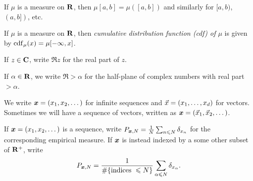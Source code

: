 If $\mu$ is a measure on $\mathbf{R}$, then $\mu[a,b] = \mu([a,b])$ and similarly 
for $[a,b)$, $(a,b])$, etc. 

If $\mu$ is a measure on $\mathbf{R}$, then \emph{cumulative distribution function 
(cdf) of $\mu$} is given by $\operatorname{cdf}_\mu(x) = \mu[-\infty,x]$. 

If $z\in \mathbf{C}$, write $\Re z$ for the real part of $z$. 

If $\alpha\in \mathbf{R}$, we write $\Re > \alpha$ for the half-plane of complex 
numbers with real part $> \alpha$. 

We write ${\boldsymbol x} = (x_1,x_2,\dots)$ for infinite sequences and 
$\vec{x} = (x_1,\dots,x_d)$ for vectors. Sometimes we will have a sequence of 
vectors, written as ${\boldsymbol x} = (\vec{x}_1,\vec{x}_2,\dots)$. 

If ${\boldsymbol x}=(x_1,x_2,\dots)$ is a sequence, write 
$P_{{\boldsymbol x},N} = \frac{1}{N} \sum_{n\leqslant N} \delta_{x_n}$ for the 
corresponding empirical measure. If ${\boldsymbol x}$ is instead indexed by a some other 
subset of $\mathbf{R}^+$, write 
\[
	P_{{\boldsymbol x},N} = \frac{1}{\# \{\text{indices }\leqslant N\}}\sum_{\alpha \leqslant N} \delta_{x_\alpha} .
\]
